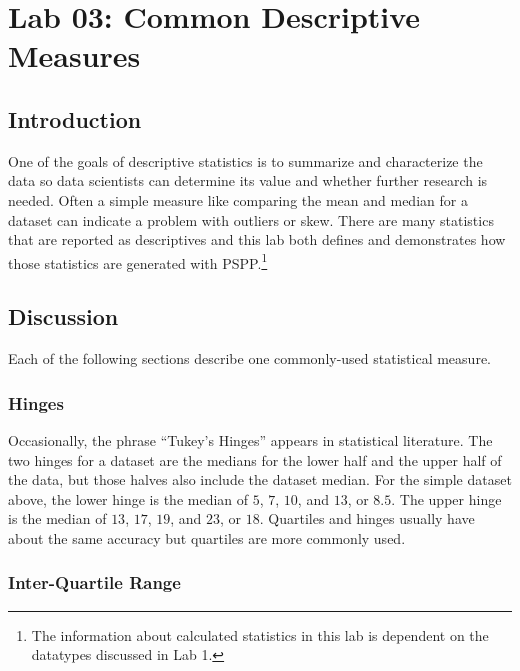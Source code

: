 \chapter{Lab 03: Common Descriptive Measures}\label{ch:lab03}

\section{Introduction}

One of the goals of descriptive statistics is to summarize and characterize the data so data scientists can determine its value and whether further research is needed. Often a simple measure like comparing the mean and median for a dataset can indicate a problem with outliers or skew. There are many statistics that are reported as descriptives and this lab both defines and demonstrates how those statistics are generated with \acs{PSPP}.\footnote{The information about calculated statistics in this lab is dependent on the datatypes discussed in Lab 1.}

\section{Discussion}

Each of the following sections describe one commonly-used statistical measure.

\subsection{Hinges}\label{lab03_hinges}

Occasionally, the phrase ``Tukey's Hinges'' appears in statistical literature. The two hinges for a dataset are the medians for the lower half and the upper half of the data, but those halves also include the dataset median. For the simple dataset above, the lower hinge is the median of $ 5 $, $ 7 $, $ 10 $, and $ 13 $, or $ 8.5 $. The upper hinge is the median of $ 13 $, $ 17 $, $ 19 $, and $ 23 $, or $ 18 $. Quartiles and hinges usually have about the same accuracy but quartiles are more commonly used.

\subsection{Inter-Quartile Range}\label{lab03_iqr}

